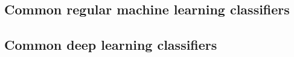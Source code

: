 

\lipsum[1-3]


\subsection{Common regular machine learning classifiers}
\label{subsec:processing_signals_ml_and_dl_ml_classifiers}


\lipsum[1-7]


\subsection{Common deep learning classifiers}
\label{subsec:processing_signals_ml_and_dl_dl_classifiers}




